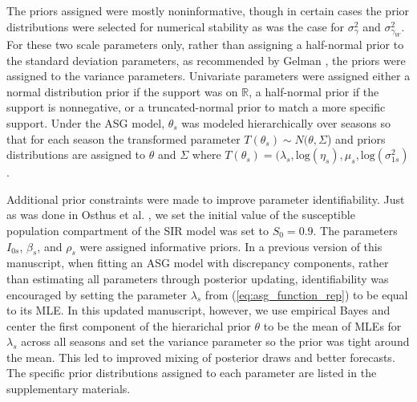 The priors assigned were mostly noninformative, though in certain cases the 
prior distributions were selected for numerical stability as was the case 
for $\sigma_{\gamma}^2$ and $\sigma_{\gamma_W}^2$. For these two scale 
parameters only, rather than assigning a half-normal prior to the standard 
deviation parameters, as recommended by Gelman \cite[]{gelman2006prior}, the 
priors were assigned to the variance parameters. Univariate parameters were 
assigned either a normal distribution prior if the support was on $\mathbb{R}$, 
a half-normal prior if the support is nonnegative, or a truncated-normal 
prior to match a more specific support. Under the ASG model, $\theta_s$ was 
modeled hierarchically over seasons so that for each season the transformed 
parameter $T(\theta_s) \sim N(\theta, \Sigma$) and priors distributions are 
assigned to $\theta$ and $\Sigma$ where
$T(\theta_s) = (\lambda_s, \text{log}(\eta_s), \mu_s, \text{log}(\sigma_{1s}^2)$.



 
Additional prior constraints were made to improve parameter identifiability. 
Just as was done in Osthus et al. \cite[]{osthus2019dynamic},
we set the initial value of the 
susceptible population compartment of the SIR model was set to $S_0 = 0.9$. 
The parameters $I_{0s}$, $\beta_s$, and $\rho_s$ were assigned informative 
priors. In a previous version of this manuscript, when fitting an ASG model
with discrepancy components,
rather than estimating all parameters through posterior updating,
identifiability was encouraged by setting
the parameter $\lambda_s$ from (\ref{eq:asg_function_rep})
to be equal to its MLE. In this updated manuscript, 
however, we use empirical Bayes and center the first component of the 
hierarichal prior $\theta$ to be the mean of MLEs for $\lambda_s$ across
all seasons and set the variance parameter so the prior was tight around the
mean. This led to improved mixing of posterior draws and better forecasts.
The 
specific prior distributions assigned to each parameter are listed in the 
supplementary materials.




